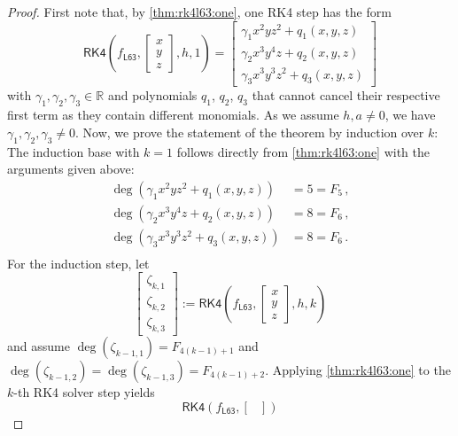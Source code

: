 \documentclass{article}
\newcommand{\R}{\mathbb{R}}
\newcommand{\lb}{\left(} %
\newcommand{\rb}{\right)} %
\newcommand{\br}[1]{\lb #1 \rb} %
\newcommand{\brOf}[1]{\!\br{#1}} %
\newcommand{\eqcm}{\,,} %
\newcommand{\eqfs}{\,.}
\begin{document}
\begin{proof}
	First note that, by \cref{thm:rk4l63:one}, one RK4 step has the form
	\begin{equation*}
		\mathsf{RK4}\brOf{f_{\mathsf{L63}}, \begin{bmatrix}
				x\\
				y\\
				z
			\end{bmatrix}, h, 1} = 
		\begin{bmatrix}
			\gamma_1 x^2 y z^2 + q_1(x,y,z)\\
			\gamma_2 x^3 y^4 z + q_2(x,y,z)\\
			\gamma_3 x^3 y^3 z^2 + q_3(x,y,z)
		\end{bmatrix}
	\end{equation*}
	with $\gamma_1,\gamma_2, \gamma_3 \in\R$ and polynomials $q_1$, $q_2$, $q_3$ that cannot cancel their respective first term as they contain different monomials. As we assume $h,a\neq 0$, we have $\gamma_1,\gamma_2, \gamma_3\neq0$.
	Now, we prove the statement of the theorem by induction over $k$:
	The induction base with $k=1$ follows directly from \cref{thm:rk4l63:one} with the arguments given above:
	\begin{align*}
		\deg(\gamma_1 x^2 y   z^2 + q_1(x,y,z))  &= 5 = F_{5}\eqcm\\
		\deg(\gamma_2 x^3 y^4 z   + q_2(x,y,z))  &= 8 = F_{6}\eqcm\\
		\deg(\gamma_3 x^3 y^3 z^2 + q_3(x,y,z))  &= 8 = F_{6}\eqfs\\
	\end{align*} 
	For the induction step, let
	\begin{equation*}
		\begin{bmatrix}
			\zeta_{k,1}\\
			\zeta_{k,2}\\
			\zeta_{k,3}
		\end{bmatrix}
		:=
		\mathsf{RK4}\brOf{f_{\mathsf{L63}}, \begin{bmatrix}
				x\\
				y\\
				z
			\end{bmatrix}, h, k}
	\end{equation*}
	and assume $\deg(\zeta_{k-1,1}) = F_{4(k-1)+1}$ and $\deg(\zeta_{k-1,2}) = \deg(\zeta_{k-1,3}) = F_{4(k-1)+2}$.
	Applying \cref{thm:rk4l63:one} to the $k$-th RK4 solver step yields
	\begin{equation*}
		\mathsf{RK4}\brOf{f_{\mathsf{L63}}, \begin{bmatrix}

\end{bmatrix}}
\end{equation*}
\end{proof}
\end{document}
